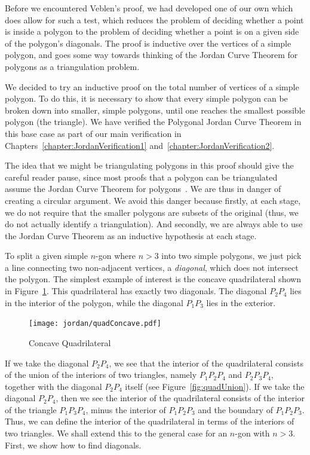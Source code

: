 Before we encountered Veblen's proof, we had developed one of our own which does allow for such a test, which reduces the problem of deciding whether a point is inside a polygon to the problem of deciding whether a point is on a given side of the polygon's diagonals. The proof is inductive over the vertices of a simple polygon, and goes some way towards thinking of the Jordan Curve Theorem for polygons as a triangulation problem.

We decided to try an inductive proof on the total number of vertices of a simple polygon. To do this, it is necessary to show that every simple polygon can be broken down into smaller, simple polygons, until one reaches the smallest possible polygon (the triangle). We have verified the Polygonal Jordan Curve Theorem in this base case as part of our main verification in Chapters~\ref{chapter:JordanVerification1} and~\ref{chapter:JordanVerification2}.

The idea that we might be triangulating polygons in this proof should give the careful reader pause, since most proofs that a polygon can be triangulated assume the Jordan Curve Theorem for polygons~\cite{PolygonsHaveEars}. We are thus in danger of creating a circular argument. We avoid this danger because firstly, at each stage, we do not require that the smaller polygons are subsets of the original (thus, we do not actually identify a triangulation). And secondly, we are always able to use the Jordan Curve Theorem as an inductive hypothesis at each stage.

To split a given simple $n$-gon where $n>3$ into two simple polygons, we just pick a line connecting two non-adjacent vertices, a \emph{diagonal}, which does not intersect the polygon. The simplest example of interest is the concave quadrilateral shown in Figure~\ref{fig:quadConcave}. This quadrilateral has exactly two diagonals. The diagonal $P_2P_4$ lies in the interior of the polygon, while the diagonal $P_1P_3$ lies in the exterior.

\begin{figure}
  \centering
  \texttt{[image: jordan/quadConcave.pdf]}
  \caption{Concave Quadrilateral}
  \label{fig:quadConcave}
\end{figure}

If we take the diagonal $P_2P_4$, we see that the interior of the quadrilateral consists of the union of the interiors of two triangles, namely $P_1P_2P_4$ and $P_2P_3P_4$, together with the diagonal $P_2P_4$ itself (see Figure~\ref{fig:quadUnion}). If we take the diagonal $P_2P_4$, then we see the interior of the quadrilateral consists of the interior of the triangle $P_1P_3P_4$, minus the interior of $P_1P_2P_3$ and the boundary of $P_1P_2P_3$. Thus, we can define the interior of the quadrilateral in terms of the interiors of two triangles. We shall extend this to the general case for an $n$-gon with $n>3$. First, we show how to find diagonals.

